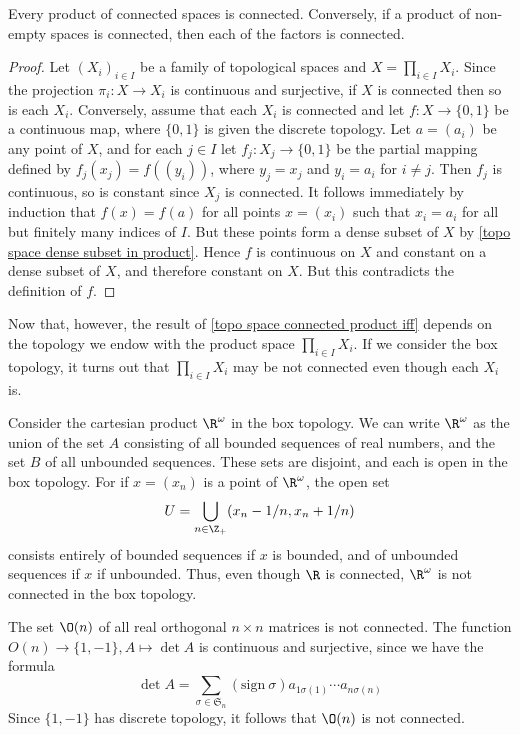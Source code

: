 \begin{proposition}\label{topo space connected product iff}
Every product of connected spaces is connected. Conversely, if a product of non-empty spaces is connected, then each of the factors is connected.
\end{proposition}
\begin{proof}
Let $(X_i)_{i\in I}$ be a family of topological spaces and $X=\prod_{i\in I}X_i$. Since the projection $\pi_i:X\to X_i$ is continuous and surjective, if $X$ is connected then so is each $X_i$. Conversely, assume that each $X_i$ is connected and let $f:X\to\{0,1\}$ be a continuous map, where $\{0,1\}$ is given the discrete topology. Let $a=(a_i)$ be any point of $X$, and for each $j\in I$ let $f_j:X_j\to\{0,1\}$ be the partial mapping defined by $f_j(x_j)=f((y_i))$, where $y_j=x_j$ and $y_i=a_i$ for $i\neq j$. Then $f_j$ is continuous, so is constant since $X_j$ is connected. It follows immediately by induction that $f(x)=f(a)$ for all points $x=(x_i)$ such that $x_i=a_i$ for all but finitely many indices of $I$. But these points form a dense subset of $X$ by \cref{topo space dense subset in product}. Hence $f$ is continuous on $X$ and constant on a dense subset of $X$, and therefore constant on $X$. But this contradicts the definition of $f$.
\end{proof}
Now that, however, the result of \cref{topo space connected product iff} depends on the topology we endow with the product space $\prod_{i\in I}X_i$. If we consider the box topology, it turns out that $\prod_{i\in I}X_i$ may be not connected even though each $X_i$ is.
\begin{example}
Consider the cartesian product $\R^\omega$ in the box topology. We can write $\R^\omega$ as the union of the set $A$ consisting of all bounded sequences of real numbers, and the set $B$ of all unbounded sequences. These sets are disjoint, and each is open in the box topology. For if $x=(x_n)$ is a point of $\R^\omega$, the open set
\[U=\bigcup_{n\in\Z_+}(x_n-1/n,x_n+1/n)\]
consists entirely of bounded sequences if $x$ is bounded, and of unbounded sequences if $x$ if unbounded. Thus, even though $\R$ is connected, $\R^\omega$ is not connected in the box topology.
\end{example}
\begin{example}
The set $\O(n)$ of all real orthogonal $n\times n$ matrices is not connected. The function $O(n)\to \{1,-1\}, A\mapsto\det A$ is continuous and surjective, since we have the formula
\[\det A=\sum_{\sigma\in\mathfrak{S}_n}(\text{sign}\ \sigma)a_{1\sigma(1)}\cdots a_{n\sigma(n)}\]
Since $\{1,-1\}$ has discrete topology, it follows that $\O(n)$ is not connected.
\end{example}
